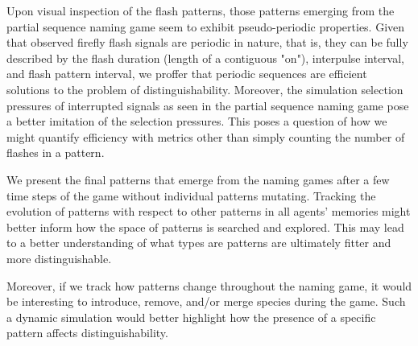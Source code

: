 
Upon visual inspection of the flash patterns, those patterns emerging from the partial sequence naming game seem to exhibit pseudo-periodic properties. 
Given that observed firefly flash signals are periodic in nature, that is, they can be fully described by the flash duration (length of a contiguous "on"), interpulse interval, and flash pattern interval, we proffer that periodic sequences are efficient solutions to the problem of distinguishability.
Moreover, the simulation selection pressures of interrupted signals as seen in the partial sequence naming game pose a better imitation of the selection pressures. 
This poses a question of how we might quantify efficiency with metrics other than simply counting the number of flashes in a pattern. 

We present the final patterns that emerge from the naming games after a few time steps of the game without individual patterns mutating. 
Tracking the evolution of patterns with respect to other patterns in all agents' memories might better inform how the space of patterns is searched and explored. 
This may lead to a better understanding of what types are patterns are ultimately fitter and more distinguishable. 

Moreover, if we track how patterns change throughout the naming game, it would be interesting to introduce, remove, and/or merge species during the game. 
Such a dynamic simulation would better highlight how the presence of a specific pattern affects distinguishability. 

 

